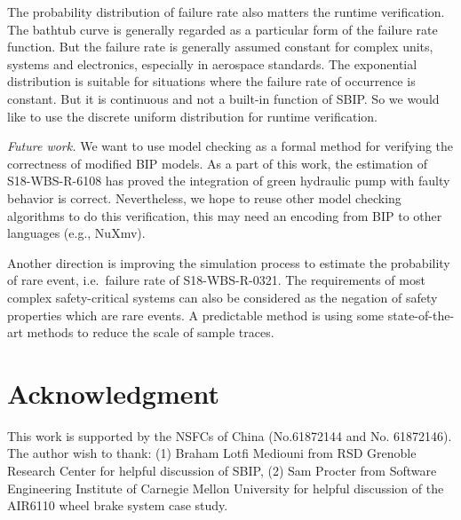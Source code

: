\documentclass[runningheads]{llncs}
\begin{document}
The probability distribution of failure rate also matters the runtime verification. The bathtub curve is generally regarded as a particular form of the failure rate function. But the failure rate is generally assumed constant for complex units, systems and electronics, especially in aerospace standards. The exponential distribution is suitable for situations where the failure rate of occurrence is constant. But it is continuous and not a built-in function of SBIP. So we would like to use the discrete uniform distribution for runtime verification.

\emph{Future work.}  We want to use model checking as a formal method for verifying the correctness of modified BIP models. As a part of this work, the estimation of S18-WBS-R-6108 has proved the integration of green hydraulic pump with faulty behavior is correct. Nevertheless, we hope to reuse other model checking algorithms to do this verification, this may need an encoding from BIP to other languages (e.g., NuXmv).

Another direction is improving the simulation process to estimate the probability of rare event, i.e.\ failure rate of S18-WBS-R-0321. The requirements of most complex safety-critical systems can also be considered as the negation of safety properties which are rare events. A predictable method is using some state-of-the-art methods\cite{rarevent1,rarevent2} to reduce the scale of sample traces.

\section*{Acknowledgment}

This work is supported by the NSFCs of China (No.61872144 and No. 61872146). The author wish to thank: (1) Braham Lotfi Mediouni from RSD Grenoble Research Center for helpful discussion of SBIP, (2) Sam Procter from Software Engineering Institute of Carnegie Mellon University for helpful discussion of the AIR6110 wheel brake system case study.

%
%
%
% 
% 
%



\end{document}
